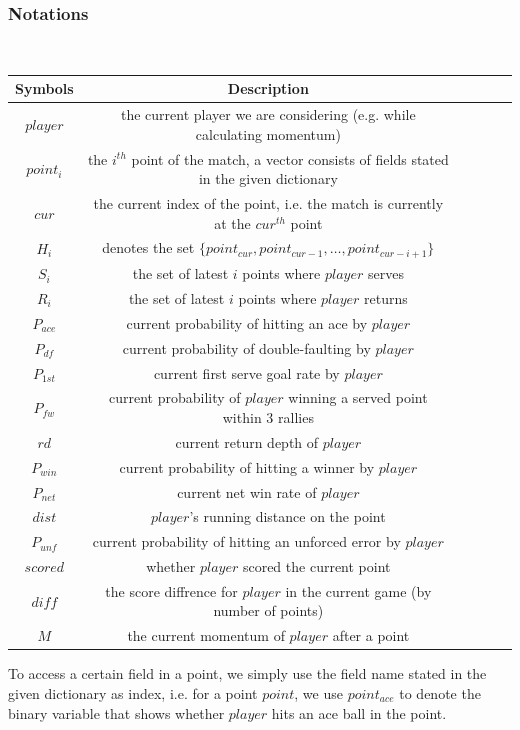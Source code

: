 \subsubsection{Notations}~{}

\begin{table}[!h]
\centering
\begin{tabular}{cccccc}
    
    \toprule
    Symbols & Description \\ 
    \midrule
    $player$ & the current player we are considering (e.g. while calculating momentum) \\
    $point_i$ & the $i^{th}$ point of the match, a vector consists of fields stated in the given dictionary \\
    $cur$ & the current index of the point, i.e. the match is currently at the $cur^{th}$ point \\
    $H_i$ & denotes the set $\{point_{cur}, point_{cur - 1}, \ldots , point_{cur - i + 1}\}$ \\
    $S_i$ & the set of latest $i$ points where $player$ serves\\
    $R_i$ & the set of latest $i$ points where $player$ returns\\
    $P_{ace}$ & current probability of hitting an ace by $player$ \\
    $P_{df}$ & current probability of double-faulting by $player$ \\
    $P_{1st}$ & current first serve goal rate by $player$ \\
    $P_{fw}$ & current probability of $player$ winning a served point within 3 rallies \\
    $rd$ & current return depth of $player$ \\
    $P_{win}$ & current probability of hitting a winner by $player$ \\
    $P_{net}$ & current net win rate of $player$ \\
    $dist$ & $player$'s running distance on the point \\
    $P_{unf}$ & current probability of hitting an unforced error by $player$ \\
    $scored$ & whether $player$ scored the current point \\
    $diff$ & the score diffrence for $player$ in the current game (by number of points) \\
    $M$ & the current momentum of $player$ after a point \\

    \bottomrule
\end{tabular}
\end{table}
To access a certain field in a point, we simply use the field name stated in the given 
dictionary as index, i.e. for a point $point$, we use $point_{ace}$ to denote the binary 
variable that shows whether $player$ hits an ace ball in the point.


